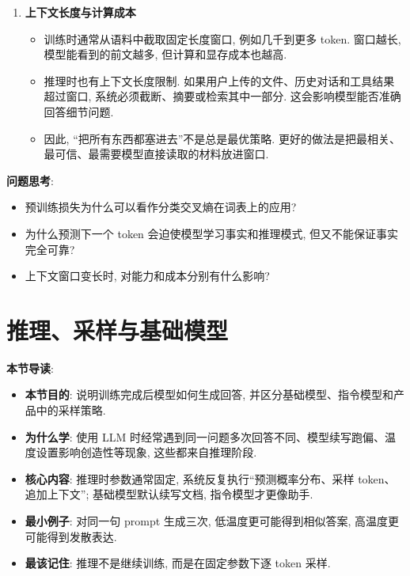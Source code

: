 \documentclass{../nndlcourse}
\begin{document}
\begin{enumerate}
\begin{itemize}
      \item Transformer 的主要计算是大规模矩阵乘法, 因而非常适合 GPU 并行. 数据中心里的 GPU 集群, 本质上是在更快地处理更多 token、更新更多参数.
      \item 本讲不展开注意力公式, 因为 W9 会专门讲. 此处只需记住: 自注意力让每个位置能根据上下文动态读取相关信息, 这是 Transformer 能处理长文本依赖的重要基础.
    \end{itemize}
  \item \textbf{上下文长度与计算成本}
    \begin{itemize}
      \item 训练时通常从语料中截取固定长度窗口, 例如几千到更多 token. 窗口越长, 模型能看到的前文越多, 但计算和显存成本也越高.
      \item 推理时也有上下文长度限制. 如果用户上传的文件、历史对话和工具结果超过窗口, 系统必须截断、摘要或检索其中一部分. 这会影响模型能否准确回答细节问题.
      \item 因此, “把所有东西都塞进去”不是总是最优策略. 更好的做法是把最相关、最可信、最需要模型直接读取的材料放进窗口.
    \end{itemize}
\end{enumerate}

\textbf{问题思考}:
\begin{itemize}
  \item 预训练损失为什么可以看作分类交叉熵在词表上的应用?
  \item 为什么预测下一个 token 会迫使模型学习事实和推理模式, 但又不能保证事实完全可靠?
  \item 上下文窗口变长时, 对能力和成本分别有什么影响?
\end{itemize}

\section{推理、采样与基础模型}

\textbf{本节导读}:
\begin{itemize}
  \item \textbf{本节目的}: 说明训练完成后模型如何生成回答, 并区分基础模型、指令模型和产品中的采样策略.
  \item \textbf{为什么学}: 使用 LLM 时经常遇到同一问题多次回答不同、模型续写跑偏、温度设置影响创造性等现象, 这些都来自推理阶段.
  \item \textbf{核心内容}: 推理时参数通常固定, 系统反复执行“预测概率分布、采样 token、追加上下文”; 基础模型默认续写文档, 指令模型才更像助手.
  \item \textbf{最小例子}: 对同一句 prompt 生成三次, 低温度更可能得到相似答案, 高温度更可能得到发散表达.
  \item \textbf{最该记住}: 推理不是继续训练, 而是在固定参数下逐 token 采样.
\end{itemize}
\end{document}
